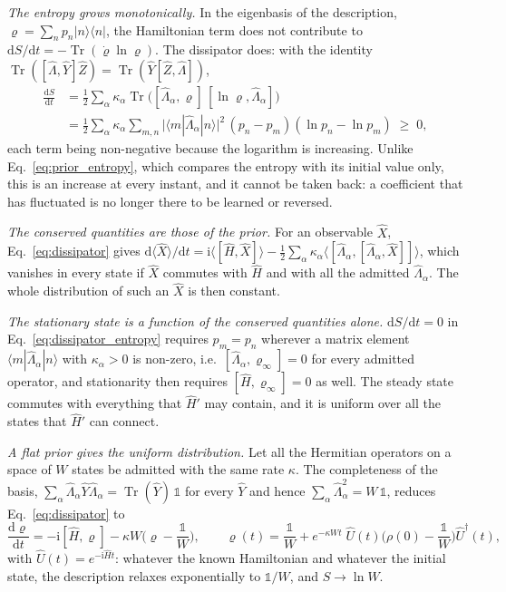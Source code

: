 \documentclass[10pt,a4paper]{article}
\newcommand{\dd}{\mathrm{d}}
\newcommand{\ii}{\mathrm{i}}
\newcommand{\Tr}{\operatorname{Tr}}
\begin{document}
\emph{The entropy grows monotonically.}
In the eigenbasis of the description, $ \varrho = \sum_np_n|n\rangle\langle n| $, the Hamiltonian term does not contribute to $ \dd S/\dd t = -\Tr(\dot\varrho\ln\varrho) $.
The dissipator does: with the identity $ \Tr([\hat\Lambda, \hat Y]\hat Z) = \Tr(\hat Y[\hat Z, \hat\Lambda]) $,
\begin{equation}\label{eq:dissipator_entropy}
  \begin{aligned}
  \frac{\dd S}{\dd t} &= \frac{1}{2}\sum_\alpha\kappa_\alpha\Tr\big([\hat\Lambda_\alpha, \varrho]\,[\ln\varrho, \hat\Lambda_\alpha]\big) \\
  &= \frac{1}{2}\sum_\alpha\kappa_\alpha\sum_{m,n}\big|\langle m|\hat\Lambda_\alpha|n\rangle\big|^{2}\,
  (p_n - p_m)(\ln p_n - \ln p_m) \;\geq\; 0 ,
  \end{aligned}
\end{equation}
each term being non-negative because the logarithm is increasing.
Unlike Eq.~\eqref{eq:prior_entropy}, which compares the entropy with its initial value only, this is an increase at every instant, and it cannot be taken back: a coefficient that has fluctuated is no longer there to be learned or reversed.

\emph{The conserved quantities are those of the prior.}
For an observable $ \hat X $, Eq.~\eqref{eq:dissipator} gives $ \dd\langle\hat X\rangle/\dd t = \ii\langle[\hat H, \hat X]\rangle - \tfrac12\sum_\alpha\kappa_\alpha\langle[\hat\Lambda_\alpha, [\hat\Lambda_\alpha, \hat X]]\rangle $, which vanishes in every state if $ \hat X $ commutes with $ \hat H $ and with all the admitted $ \hat\Lambda_\alpha $.
The whole distribution of such an $ \hat X $ is then constant.

\emph{The stationary state is a function of the conserved quantities alone.}
$ \dd S/\dd t = 0 $ in Eq.~\eqref{eq:dissipator_entropy} requires $ p_m = p_n $ wherever a matrix element $ \langle m|\hat\Lambda_\alpha|n\rangle $ with $ \kappa_\alpha > 0 $ is non-zero, i.e.\ $ [\hat\Lambda_\alpha, \varrho_\infty] = 0 $ for every admitted operator, and stationarity then requires $ [\hat H, \varrho_\infty] = 0 $ as well.
The steady state commutes with everything that $ \hat H' $ may contain, and it is uniform over all the states that $ \hat H' $ can connect.

\emph{A flat prior gives the uniform distribution.}
Let all the Hermitian operators on a space of $ W $ states be admitted with the same rate $ \kappa $.
The completeness of the basis, $ \sum_\alpha\hat\Lambda_\alpha\hat Y\hat\Lambda_\alpha = \Tr(\hat Y)\,\mathbb{1} $ for every $ \hat Y $ and hence $ \sum_\alpha\hat\Lambda_\alpha^{2} = W\,\mathbb{1} $, reduces Eq.~\eqref{eq:dissipator} to
\begin{equation}\label{eq:flat_relax}
  \frac{\dd\varrho}{\dd t} = -\ii[\hat H, \varrho] - \kappa W\Big(\varrho - \frac{\mathbb{1}}{W}\Big) ,
  \qquad
  \varrho(t) = \frac{\mathbb{1}}{W}
  + e^{-\kappa Wt}\;\hat U(t)\Big(\rho(0) - \frac{\mathbb{1}}{W}\Big)\hat U^\dagger(t) ,
\end{equation}
with $ \hat U(t) = e^{-\ii \hat Ht} $: whatever the known Hamiltonian and whatever the initial state, the description relaxes exponentially to $ \mathbb{1}/W $, and $ S \to \ln W $.
\end{document}
